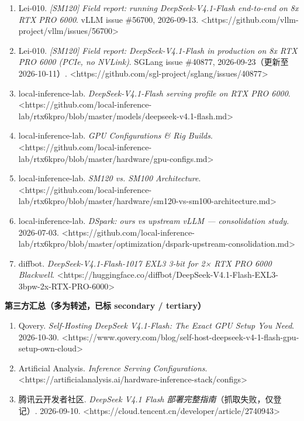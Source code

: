 \begin{enumerate}
  \item Lei-010. \textit{[SM120] Field report: running DeepSeek-V4.1-Flash end-to-end on 8x RTX PRO 6000}. vLLM issue \#56700, 2026-09-13. <https://github.com/vllm-project/vllm/issues/56700>
  \item Lei-010. \textit{[SM120] Field report: DeepSeek-V4.1-Flash in production on 8x RTX PRO 6000 (PCIe, no NVLink)}. SGLang issue \#40877, 2026-09-23（更新至 2026-10-11）. <https://github.com/sgl-project/sglang/issues/40877>
  \item local-inference-lab. \textit{DeepSeek-V4.1-Flash serving profile on RTX PRO 6000}. <https://github.com/local-inference-lab/rtx6kpro/blob/master/models/deepseek-v4.1-flash.md>
  \item local-inference-lab. \textit{GPU Configurations \& Rig Builds}. <https://github.com/local-inference-lab/rtx6kpro/blob/master/hardware/gpu-configs.md>
  \item local-inference-lab. \textit{SM120 vs. SM100 Architecture}. <https://github.com/local-inference-lab/rtx6kpro/blob/master/hardware/sm120-vs-sm100-architecture.md>
  \item local-inference-lab. \textit{DSpark: ours vs upstream vLLM — consolidation study}. 2026-07-03. <https://github.com/local-inference-lab/rtx6kpro/blob/master/optimization/dspark-upstream-consolidation.md>
  \item diffbot. \textit{DeepSeek-V4.1-Flash-1017 EXL3 3-bit for 2× RTX PRO 6000 Blackwell}. <https://huggingface.co/diffbot/DeepSeek-V4.1-Flash-EXL3-3bpw-2x-RTX-PRO-6000>
\end{enumerate}

\textbf{第三方汇总（多为转述，已标 secondary / tertiary）}


\begin{enumerate}
  \item Qovery. \textit{Self-Hosting DeepSeek V4.1-Flash: The Exact GPU Setup You Need}. 2026-10-30. <https://www.qovery.com/blog/self-host-deepseek-v4-1-flash-gpu-setup-own-cloud>
  \item Artificial Analysis. \textit{Inference Serving Configurations}. <https://artificialanalysis.ai/hardware-inference-stack/configs>
  \item 腾讯云开发者社区. \textit{DeepSeek V4.1 Flash 部署完整指南}（抓取失败，仅登记）. 2026-09-10. <https://cloud.tencent.cn/developer/article/2740943>
\end{enumerate}
